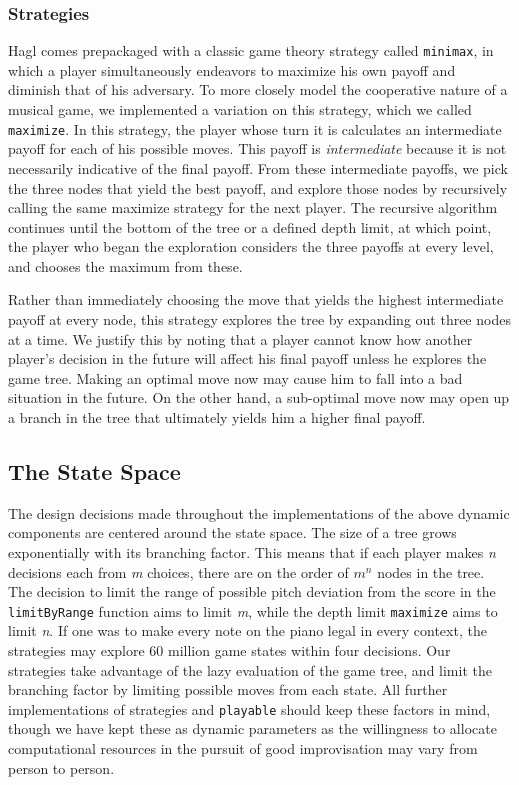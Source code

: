 \documentclass{article}
\begin{document}
\subsubsection{Strategies}

Hagl comes prepackaged with a classic game theory strategy
called \texttt{minimax}, in which a player simultaneously endeavors to
maximize his own payoff and diminish that of his adversary. To more
closely model the cooperative nature of a musical game, we implemented a
variation on this strategy, which we called \texttt{maximize}. In this
strategy, the player whose turn it is calculates an intermediate payoff
for each of his possible moves. This payoff is \emph{intermediate} because it is
not necessarily indicative of the final payoff.  From these intermediate payoffs, we pick the three nodes that yield the best payoff, and explore those nodes by
recursively calling the same maximize strategy for the next player. The
recursive algorithm continues until the bottom of the tree or a defined
depth limit, at which point, the player who began the exploration
considers the three payoffs at every level, and chooses the maximum from
these.

Rather than immediately choosing the move that yields the highest intermediate payoff at every node, this strategy explores the tree by expanding out three nodes at a time.  We justify this by noting that a player cannot know how another player's decision in the future will affect his final payoff unless he explores the game tree.  Making an optimal move now may cause him to fall into a bad situation in the future.  On the other hand, a sub-optimal move now may open up a branch in the tree that ultimately yields him a higher final payoff.

\subsection{The State Space}

The design decisions made throughout the implementations of the above
dynamic components are centered around the state space. The size of a
tree grows exponentially with its branching factor. This means that if
each player makes \emph{n} decisions each from \emph{m} choices,
there are on the order of \emph{$m^{n}$} nodes in the tree. The decision
to limit the range of possible pitch deviation from the score in the
\texttt{limitByRange} function aims to limit \emph{m}, while the depth
limit \texttt{maximize} aims to limit \emph{n}. If one was to make
every note on the piano legal in every context, the strategies may
explore 60 million game states within four
decisions. Our strategies take advantage of the lazy
evaluation of the game tree, and limit the branching factor by
limiting possible moves from each state. All further implementations of
strategies and \texttt{playable} should keep these factors in mind,
though we have kept these as dynamic parameters as the
willingness to allocate computational resources in the pursuit of good
improvisation may vary from person to person.
\end{document}
